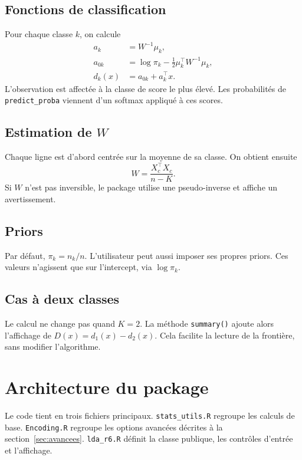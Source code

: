 \documentclass[11pt,a4paper]{article}
\begin{document}
\subsection{Fonctions de classification}

Pour chaque classe \(k\), on calcule
\begin{align}
  a_k &= W^{-1} \mu_k, \\
  a_{0k} &= \log \pi_k - \tfrac{1}{2} \mu_k^\top W^{-1} \mu_k, \\
  d_k(x) &= a_{0k} + a_k^\top x.
\end{align}
L'observation est affect\'ee \`a la classe de score le plus \'elev\'e. Les
probabilit\'es de \texttt{predict\_proba} viennent d'un softmax appliqu\'e \`a
ces scores.

\subsection{Estimation de \(W\)}

Chaque ligne est d'abord centr\'ee sur la moyenne de sa classe. On obtient
ensuite
\begin{equation}
  W = \frac{X_c^\top X_c}{n - K}.
\end{equation}
Si \(W\) n'est pas inversible, le package utilise une pseudo-inverse et
affiche un avertissement.

\subsection{Priors}

Par d\'efaut, \(\pi_k = n_k / n\). L'utilisateur peut aussi imposer ses propres
priors. Ces valeurs n'agissent que sur l'intercept, via \(\log \pi_k\).

\subsection{Cas \`a deux classes}

Le calcul ne change pas quand \(K=2\). La m\'ethode
\texttt{summary()} ajoute alors l'affichage de \(D(x)=d_1(x)-d_2(x)\). Cela
facilite la lecture de la fronti\`ere, sans modifier l'algorithme.

\section{Architecture du package}

Le code tient en trois fichiers principaux.
\texttt{stats\_utils.R} regroupe les calculs de base.
\texttt{Encoding.R} regroupe les options avanc\'ees d\'ecrites \`a la
section~\ref{sec:avancees}.
\texttt{lda\_r6.R} d\'efinit la classe publique, les contr\^oles d'entr\'ee et
l'affichage.
\end{document}
